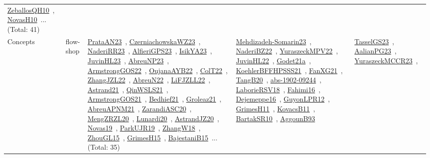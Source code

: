 {\begin{longtable}{lp{3cm}>{\raggedright\arraybackslash}p{6cm}>{\raggedright\arraybackslash}p{6cm}>{\raggedright\arraybackslash}p{8cm}}
\href{works/ZeballosQH10.pdf}{ZeballosQH10}~\cite{ZeballosQH10}, \href{works/NovasH10.pdf}{NovasH10}~\cite{NovasH10}... (Total: 41)\\
Concepts & flow-shop & \href{works/PrataAN23.pdf}{PrataAN23}~\cite{PrataAN23}, \href{works/CzerniachowskaWZ23.pdf}{CzerniachowskaWZ23}~\cite{CzerniachowskaWZ23}, \href{works/NaderiRR23.pdf}{NaderiRR23}~\cite{NaderiRR23}, \href{works/AlfieriGPS23.pdf}{AlfieriGPS23}~\cite{AlfieriGPS23}, \href{works/IsikYA23.pdf}{IsikYA23}~\cite{IsikYA23}, \href{works/JuvinHL23.pdf}{JuvinHL23}~\cite{JuvinHL23}, \href{works/AbreuNP23.pdf}{AbreuNP23}~\cite{AbreuNP23}, \href{works/ArmstrongGOS22.pdf}{ArmstrongGOS22}~\cite{ArmstrongGOS22}, \href{works/OujanaAYB22.pdf}{OujanaAYB22}~\cite{OujanaAYB22}, \href{works/ColT22.pdf}{ColT22}~\cite{ColT22}, \href{works/ZhangJZL22.pdf}{ZhangJZL22}~\cite{ZhangJZL22}, \href{works/AbreuN22.pdf}{AbreuN22}~\cite{AbreuN22}, \href{works/LiFJZLL22.pdf}{LiFJZLL22}~\cite{LiFJZLL22}, \href{works/Astrand21.pdf}{Astrand21}~\cite{Astrand21}, \href{works/QinWSLS21.pdf}{QinWSLS21}~\cite{QinWSLS21}, \href{works/ArmstrongGOS21.pdf}{ArmstrongGOS21}~\cite{ArmstrongGOS21}, \href{works/Bedhief21.pdf}{Bedhief21}~\cite{Bedhief21}, \href{works/Groleaz21.pdf}{Groleaz21}~\cite{Groleaz21}, \href{works/AbreuAPNM21.pdf}{AbreuAPNM21}~\cite{AbreuAPNM21}, \href{works/ZarandiASC20.pdf}{ZarandiASC20}~\cite{ZarandiASC20}, \href{works/MengZRZL20.pdf}{MengZRZL20}~\cite{MengZRZL20}, \href{works/Lunardi20.pdf}{Lunardi20}~\cite{Lunardi20}, \href{works/AstrandJZ20.pdf}{AstrandJZ20}~\cite{AstrandJZ20}, \href{works/Novas19.pdf}{Novas19}~\cite{Novas19}, \href{works/ParkUJR19.pdf}{ParkUJR19}~\cite{ParkUJR19}, \href{works/ZhangW18.pdf}{ZhangW18}~\cite{ZhangW18}, \href{works/ZhouGL15.pdf}{ZhouGL15}~\cite{ZhouGL15}, \href{works/GrimesH15.pdf}{GrimesH15}~\cite{GrimesH15}, \href{works/BajestaniB15.pdf}{BajestaniB15}~\cite{BajestaniB15}... (Total: 35) & \href{works/Mehdizadeh-Somarin23.pdf}{Mehdizadeh-Somarin23}~\cite{Mehdizadeh-Somarin23}, \href{works/NaderiBZ22.pdf}{NaderiBZ22}~\cite{NaderiBZ22}, \href{works/YuraszeckMPV22.pdf}{YuraszeckMPV22}~\cite{YuraszeckMPV22}, \href{works/JuvinHL22.pdf}{JuvinHL22}~\cite{JuvinHL22}, \href{works/Godet21a.pdf}{Godet21a}~\cite{Godet21a}, \href{works/KoehlerBFFHPSSS21.pdf}{KoehlerBFFHPSSS21}~\cite{KoehlerBFFHPSSS21}, \href{works/FanXG21.pdf}{FanXG21}~\cite{FanXG21}, \href{works/TangB20.pdf}{TangB20}~\cite{TangB20}, \href{works/abs-1902-09244.pdf}{abs-1902-09244}~\cite{abs-1902-09244}, \href{works/LaborieRSV18.pdf}{LaborieRSV18}~\cite{LaborieRSV18}, \href{works/Fahimi16.pdf}{Fahimi16}~\cite{Fahimi16}, \href{works/Dejemeppe16.pdf}{Dejemeppe16}~\cite{Dejemeppe16}, \href{works/GuyonLPR12.pdf}{GuyonLPR12}~\cite{GuyonLPR12}, \href{works/GrimesH11.pdf}{GrimesH11}~\cite{GrimesH11}, \href{works/KovacsB11.pdf}{KovacsB11}~\cite{KovacsB11}, \href{works/BartakSR10.pdf}{BartakSR10}~\cite{BartakSR10}, \href{works/AggounB93.pdf}{AggounB93}~\cite{AggounB93} & \href{works/TasselGS23.pdf}{TasselGS23}~\cite{TasselGS23}, \href{works/AalianPG23.pdf}{AalianPG23}~\cite{AalianPG23}, \href{works/YuraszeckMCCR23.pdf}{YuraszeckMCCR23}~\cite{YuraszeckMCCR23}, 
\end{longtable}}
